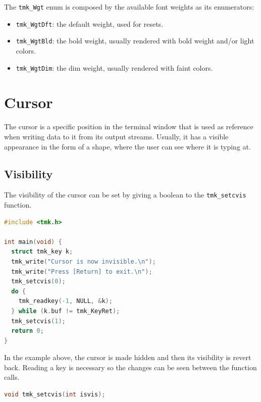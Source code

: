 \documentclass{report}
\begin{document}
The \texttt{tmk\_Wgt} enum is composed by the available font weights as its enumerators:
\begin{itemize}
  \item \texttt{tmk\_WgtDft}: the default weight, used for resets.
  \item \texttt{tmk\_WgtBld}: the bold weight, usually rendered with bold weight and/or light colors.
  \item \texttt{tmk\_WgtDim}: the dim weight, usually rendered with faint colors.
\end{itemize}
\section{Cursor}
The cursor is a specific position in the terminal window that is used as reference when writing data to it from its output streams. Usually, it has a visible appearance in the form of a shape, where the user can see where it is typing at.
\subsection{Visibility}
The visibility of the cursor can be set by giving a boolean to the \texttt{tmk\_setcvis} function.
\begin{lstlisting}[language=c,caption=an example that sets the cursor visibility.]
#include <tmk.h>

int main(void) {
  struct tmk_key k;
  tmk_write("Cursor is now invisible.\n");
  tmk_write("Press [Return] to exit.\n");
  tmk_setcvis(0);
  do {
    tmk_readkey(-1, NULL, &k);
  } while (k.buf != tmk_KeyRet);
  tmk_setcvis(1);
  return 0;
}
\end{lstlisting}

In the example above, the cursor is made hidden and then its visibility is revert back. Reading a key is necessary so the changes can be seen between the function calls.
\begin{lstlisting}[language=c,caption=the declaration of the \texttt{tmk\_setcvis} function.]
void tmk_setcvis(int isvis);
\end{lstlisting}
\end{document}
